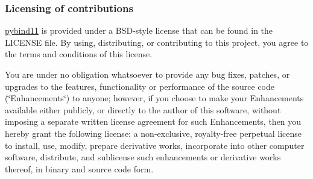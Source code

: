 \subsubsection*{Licensing of contributions}

\mbox{\hyperlink{namespacepybind11}{pybind11}} is provided under a B\+S\+D-\/style license that can be found in the {\ttfamily L\+I\+C\+E\+N\+SE} file. By using, distributing, or contributing to this project, you agree to the terms and conditions of this license.

You are under no obligation whatsoever to provide any bug fixes, patches, or upgrades to the features, functionality or performance of the source code (\char`\"{}\+Enhancements\char`\"{}) to anyone; however, if you choose to make your Enhancements available either publicly, or directly to the author of this software, without imposing a separate written license agreement for such Enhancements, then you hereby grant the following license\+: a non-\/exclusive, royalty-\/free perpetual license to install, use, modify, prepare derivative works, incorporate into other computer software, distribute, and sublicense such enhancements or derivative works thereof, in binary and source code form. 